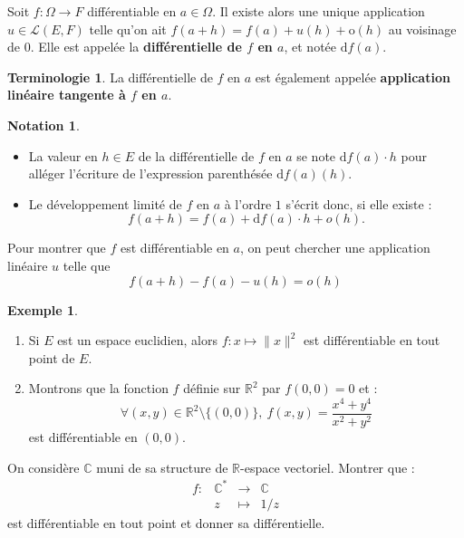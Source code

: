 \documentclass[french]{article}
\newcommand{\R}{\mathbb{R}}
\newcommand{\C}{\mathbb{C}}
\newcommand{\st}{^*}
\renewcommand{\o}{\text{o}}
\renewcommand{\d}{\text{d}}
\theoremstyle{plain}
\theoremstyle{definition}
\newtheorem*{ex}{Exemple}
\newtheorem*{notation}{Notation}
\newtheorem*{terminologie}{Terminologie}
\theoremstyle{remark}
\begin{document}
\begin{thm}%
	Soit $f:\Omega\to F$ différentiable en $a\in\Omega$. Il existe alors une unique application $u\in\mathcal{L}(E,F)$ telle qu'on ait $f(a+h)=f(a)+u(h)+\o(h)$ au voisinage de $0$. Elle est appelée la \textbf{différentielle de $f$ en $a$}, et notée $\d f(a)$.
\end{thm}

\begin{terminologie}
	La différentielle de $f$ en $a$ est également appelée \textbf{application linéaire tangente à $f$ en $a$}.
\end{terminologie}

\begin{notation}
	\begin{itemize}
		\item La valeur en $h\in E$ de la différentielle de $f$ en $a$ se note $\d f(a)\cdot h$ pour alléger l'écriture de l'expression parenthésée $\d f(a)(h)$.
		\item Le développement limité de $f$ en $a$ à l'ordre $1$ s'écrit donc, si elle existe :
		$$f(a+h)=f(a)+\d f(a)\cdot h+o(h).$$
	\end{itemize}
\end{notation}

\begin{met}
	Pour montrer que $f$ est différentiable en $a$, on peut chercher une application linéaire $u$ telle que $$f(a+h)-f(a)-u(h)=o(h)$$
\end{met}

\begin{ex}
	\begin{enumerate}
		\item Si $E$ est un espace euclidien, alors $f:x\mapsto\lVert x\rVert^2$ est différentiable en tout point de $E$.
		\item Montrons que la fonction $f$ définie sur $\R^2$ par $f(0,0)=0$ et : $$\forall (x,y)\in\R^2\setminus\{(0,0)\},\ f(x,y)=\frac{x^4+y^4}{x^2+y^2}$$ est différentiable en $(0,0)$.
	\end{enumerate}
\end{ex}

\begin{exo}
	On considère $\C$ muni de sa structure de $\R$-espace vectoriel. Montrer que : $$\begin{array}{lrcl}
		f:&\C\st&\longrightarrow&\C\\
		&z&\longmapsto&1/z
	\end{array}$$ est différentiable en tout point et donner sa différentielle.
\end{exo}
\end{document}
